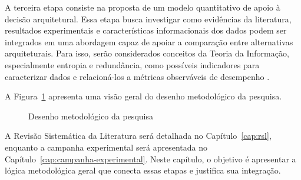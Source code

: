 A terceira etapa consiste na proposta de um modelo quantitativo de apoio à decisão arquitetural. Essa etapa busca investigar como evidências da literatura, resultados experimentais e características informacionais dos dados podem ser integrados em uma abordagem capaz de apoiar a comparação entre alternativas arquiteturais. Para isso, serão considerados conceitos da Teoria da Informação, especialmente entropia e redundância, como possíveis indicadores para caracterizar dados e relacioná-los a métricas observáveis de desempenho \cite{shannon1948mathematical}.

A Figura~\ref{fig:desenho-metodologico} apresenta uma visão geral do desenho metodológico da pesquisa.

\begin{figure}[htbp]
\centering
{}
\caption{Desenho metodológico da pesquisa}
\label{fig:desenho-metodologico}
\end{figure}

A Revisão Sistemática da Literatura será detalhada no Capítulo~\ref{cap:rsl}, enquanto a campanha experimental será apresentada no Capítulo~\ref{cap:campanha-experimental}. Neste capítulo, o objetivo é apresentar a lógica metodológica geral que conecta essas etapas e justifica sua integração.

